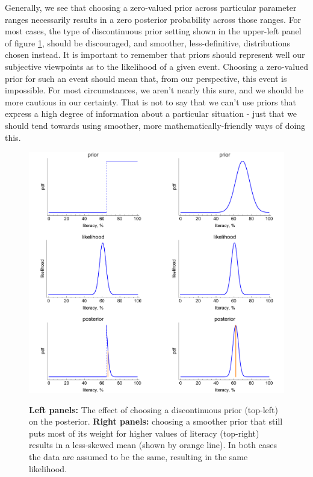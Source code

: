 \documentclass[11pt,fullpage]{book}
\begin{document}
Generally, we see that choosing a zero-valued prior across particular parameter ranges necessarily results in a zero posterior probability across those ranges. For most cases, the type of discontinuous prior setting shown in the upper-left panel of figure \ref{fig:Prior_overZealous}, should be discouraged, and smoother, less-definitive, distributions chosen instead. It is important to remember that priors should represent well our subjective viewpoints as to the likelihood of a given event. Choosing a zero-valued prior for such an event should mean that, from our perspective, this event is impossible. For most circumstances, we aren't nearly this sure, and we should be more cautious in our certainty. That is not to say that we can't use priors that express a high degree of information about a particular situation - just that we should tend towards using smoother, more mathematically-friendly ways of doing this.

\begin{figure}
\centering
\scalebox{0.40} 
{\includegraphics{Prior_overZealous.pdf}}\caption{\textbf{Left panels:} The effect of choosing a discontinuous prior (top-left) on the posterior. \textbf{Right panels:} choosing a smoother prior that still puts most of its weight for higher values of literacy (top-right) results in a less-skewed mean (shown by orange line). In both cases the data are assumed to be the same, resulting in the same likelihood.}\label{fig:Prior_overZealous}
\end{figure}
\end{document}

